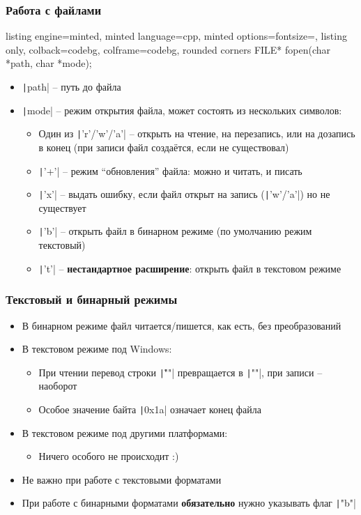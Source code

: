 \documentclass[10pt]{beamer}
\begin{document}
\begin{frame}[fragile]
\frametitle{Работа с файлами}
\begin{tcblisting}{listing engine=minted, minted language=cpp, minted options={fontsize=\scriptsize}, listing only, colback=codebg, colframe=codebg, rounded corners}
FILE* fopen(char *path, char *mode);
\end{tcblisting}
\pause
{}
\begin{itemize}
\item \texttt|path| -- путь до файла
\pause
\item \texttt|mode| -- режим открытия файла, может состоять из нескольких символов:
\pause
\begin{itemize}
\item Один из \texttt|'r'/'w'/'a'| -- открыть на чтение, на перезапись, или на дозапись в конец (при записи файл создаётся, если не существовал)
\pause
\item \texttt|'+'| -- режим ``обновления'' файла: можно и читать, и писать
\pause
\item \texttt|'x'| -- выдать ошибку, если файл открыт на запись (\texttt|'w'/'a'|) но не существует
\pause
\item \texttt|'b'| -- открыть файл в бинарном режиме (по умолчанию режим текстовый)
\pause
\item \texttt|'t'| -- \textbf{нестандартное расширение}: открыть файл в текстовом режиме
\end{itemize}
\end{itemize}
\end{frame}

\begin{frame}[fragile]
\frametitle{Текстовый и бинарный режимы}
\begin{itemize}
\item В бинарном режиме файл читается/пишется, как есть, без преобразований
\pause
\item В текстовом режиме под Windows:
\pause
\begin{itemize}
\item При чтении перевод строки \texttt|"\r\n"| превращается в \texttt|"\n"|, при записи -- наоборот
\pause
\item Особое значение байта \texttt|0x1a| означает конец файла
\end{itemize}
\pause
\item В текстовом режиме под другими платформами:
\pause
\begin{itemize}
\item Ничего особого не происходит :)
\end{itemize}
\pause
\item Не важно при работе с текстовыми форматами
\pause
\item При работе с бинарными форматами \textbf{обязательно} нужно указывать флаг \texttt|"b"|
\end{itemize}
\end{frame}
\end{document}
